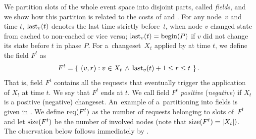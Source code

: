 We partition slots of the whole event space into disjoint parts, called
\emph{fields}, and we show how this partition is related to the costs of \ALGTC
and \OPT. For any node~$v$ and time $t$, $\textrm{last}_v(t)$ denotes the last time
strictly before~$t$, when node $v$ changed state from cached to non-cached or
vice versa; $\textrm{last}_v(t) = \textrm{begin}(P)$ if $v$ did not change its state before $t$ in
phase $P$. For a~changeset~$X_t$ applied by
\ALGTC at time $t$, we define the field $F^t$ as
\[
  F^t = \left\{\ (v,r) : v \in X_t \, \wedge\, \textrm{last}_v(t)+1 \leq r \leq t\ \right\}.
\]
That is, field $F^t$ contains all the requests that eventually trigger the
application of $X_t$ at time $t$. We say that $F^t$ ends at $t$. We call field
$F^t$ \emph{positive} (\emph{negative}) if $X_t$ is a positive (negative)
changeset. An~example of a~partitioning into fields is given in
. We define $\textrm{req}(F^t)$ as the number of requests
belonging to slots of~$F^t$ and let $\textrm{size}(F^t)$ be the number of involved
nodes (note that $\textrm{size}(F^t) = |X_t|)$. The observation below follows
immediately by .

